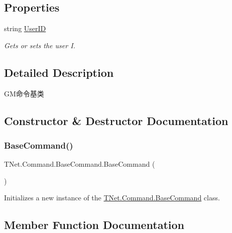 \subsection*{Properties}
\begin{DoxyCompactItemize}
\item 
string \mbox{\hyperlink{class_t_net_1_1_command_1_1_base_command_a3778c95edf8643bbe4936566f964eebb}{User\+ID}}
\begin{DoxyCompactList}\small\item\em Gets or sets the user I. \end{DoxyCompactList}\end{DoxyCompactItemize}


\subsection{Detailed Description}
G\+M命令基类 



\subsection{Constructor \& Destructor Documentation}
\mbox{\label{class_t_net_1_1_command_1_1_base_command_add73971418b21606e67278ebbc265210}} 
\subsubsection{\texorpdfstring{Base\+Command()}{BaseCommand()}}
{\footnotesize\ttfamily T\+Net.\+Command.\+Base\+Command.\+Base\+Command (\begin{DoxyParamCaption}{ }\end{DoxyParamCaption})\hspace{0.3cm}{\ttfamily [protected]}}



Initializes a new instance of the \mbox{\hyperlink{class_t_net_1_1_command_1_1_base_command}{T\+Net.\+Command.\+Base\+Command}} class. 



\subsection{Member Function Documentation}
\mbox{\label{class_t_net_1_1_command_1_1_base_command_a9b6c6ebf3f49efbf7b12321b954fbe19}} 
